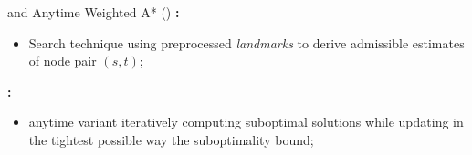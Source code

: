 \begin{frame}{\ALT{} and Anytime Weighted A* (\AWA{})}
    \textbf{\ALT{}:}
    \begin{itemize}
        \item Search technique using preprocessed \textit{landmarks} to derive admissible
            estimates of node pair $(s, t)$;
    \end{itemize}
    \textbf{\AWA{}:}
    \begin{itemize}
        \item \WA{} anytime variant iteratively computing suboptimal solutions while updating in the tightest possible way the suboptimality bound;
    \end{itemize}
\end{frame}